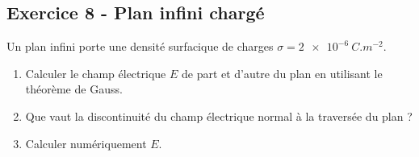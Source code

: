 \documentclass[12pt,a4paper]{article}
\begin{document}
\subsection*{Exercice 8 - Plan infini chargé \niveau{\moyen}}

\begin{boiteexercice}
Un plan infini porte une densité surfacique de charges $\sigma = \qty{2e-6}{C.m^{-2}}$.
\begin{enumerate}
  \item Calculer le champ électrique $E$ de part et d'autre du plan en utilisant le théorème de Gauss.
  \item Que vaut la discontinuité du champ électrique normal à la traversée du plan ?
  \item Calculer numériquement $E$.
\end{enumerate}
\end{boiteexercice}
\end{document}
